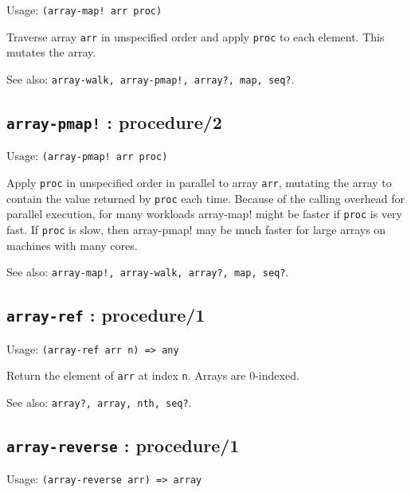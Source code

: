 \documentclass[
]{article}
\newcommand{\passthrough}[1]{#1}
\begin{document}
Usage: \passthrough{\lstinline"(array-map! arr proc)"}

Traverse array \passthrough{\lstinline!arr!} in unspecified order and
apply \passthrough{\lstinline!proc!} to each element. This mutates the
array.

See also:
\passthrough{\lstinline"array-walk, array-pmap!, array?, map, seq?"}.

\hypertarget{array-pmap-procedure2-1}{%
\subsection{\texorpdfstring{\texttt{array-pmap!} :
procedure/2}{array-pmap! : procedure/2}}\label{array-pmap-procedure2-1}}

Usage: \passthrough{\lstinline"(array-pmap! arr proc)"}

Apply \passthrough{\lstinline!proc!} in unspecified order in parallel to
array \passthrough{\lstinline!arr!}, mutating the array to contain the
value returned by \passthrough{\lstinline!proc!} each time. Because of
the calling overhead for parallel execution, for many workloads
array-map! might be faster if \passthrough{\lstinline!proc!} is very
fast. If \passthrough{\lstinline!proc!} is slow, then array-pmap! may be
much faster for large arrays on machines with many cores.

See also:
\passthrough{\lstinline"array-map!, array-walk, array?, map, seq?"}.

\hypertarget{array-ref-procedure1-1}{%
\subsection{\texorpdfstring{\texttt{array-ref} :
procedure/1}{array-ref : procedure/1}}\label{array-ref-procedure1-1}}

Usage: \passthrough{\lstinline!(array-ref arr n) => any!}

Return the element of \passthrough{\lstinline!arr!} at index
\passthrough{\lstinline!n!}. Arrays are 0-indexed.

See also: \passthrough{\lstinline!array?, array, nth, seq?!}.

\hypertarget{array-reverse-procedure1-1}{%
\subsection{\texorpdfstring{\texttt{array-reverse} :
procedure/1}{array-reverse : procedure/1}}\label{array-reverse-procedure1-1}}

Usage: \passthrough{\lstinline!(array-reverse arr) => array!}
\end{document}
